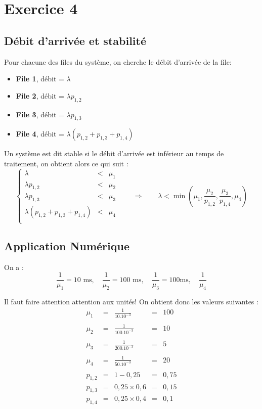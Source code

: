 \documentclass[a4paper, 11pt, fleqn]{article}
\newcommand{\inve}[1]{\frac{1}{#1}}
\begin{document}
\section{Exercice 4}


\subsection{Débit d'arrivée et stabilité}

Pour chacune des files du système, on cherche le débit d'arrivée de la file:
\begin{itemize}
	\item \textbf{File 1}, débit = $\lambda$
	\item \textbf{File 2}, débit = $\lambda p_{1,2}$
	\item \textbf{File 3}, débit = $\lambda p_{1,3}$
	\item \textbf{File 4}, débit = $\lambda (p_{1,2} + p_{1,3} + p_{1,4})$
\end{itemize}

Un système est dit stable si le débit d'arrivée est inférieur au temps de traitement, on obtient
alors ce qui suit : $$
\left \lbrace \begin{array}{rcl}
	\lambda &<& \mu_1 \\
	\lambda p_{1,2} &<& \mu_2 \\
	\lambda p_{1,3} &<& \mu_3 \\
	\lambda (p_{1,2} + p_{1,3} + p_{1,4}) &<& \mu_4 \\
\end{array} \right.
\qquad \Longrightarrow \qquad \lambda < \min (\mu_1, \frac{\mu_2}{p_{1,2}}, \frac{\mu_3}{p_{1,4}}, \mu_4) $$

\subsection{Application Numérique}

On a : $$
\inve{\mu_1} = 10 \mbox{ ms}, \quad \inve{\mu_2} = 100 \mbox{ ms}, \quad \inve{\mu_3} = 100 \mbox{
ms}, \quad \inve{\mu_4} $$

Il faut faire attention attention aux unités! On obtient donc les valeurs suivantes : $$
\begin{array}{rcccl}
	\mu_1 & = & \displaystyle \inve{10. 10^{-3}} & = & 100 \\~\\
	\mu_2 & = & \displaystyle \inve{100. 10^{-3}} & = & 10 \\~\\
	\mu_3 & = & \displaystyle \inve{200. 10^{-3}} & = & 5 \\~\\
	\mu_4 & = & \displaystyle \inve{50. 10^{-3}} & = & 20 \\~\\
	p_{1,2} & = & 1 - 0,25 & = & 0,75 \\
	p_{1,3} & = & 0,25 \times 0,6 & = & 0,15 \\
	p_{1,4} & = & 0,25 \times 0,4 & = & 0,1 \\
\end{array} $$
\end{document}
